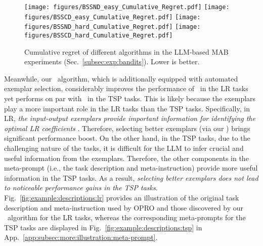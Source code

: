 \begin{figure}[h]
\vspace{3mm}
\centering
\texttt{[image: figures/BSSND\_easy\_Cumulative\_Regret.pdf]}
\texttt{[image: figures/BSSCD\_easy\_Cumulative\_Regret.pdf]}
\texttt{[image: figures/BSSND\_hard\_Cumulative\_Regret.pdf]}
\texttt{[image: figures/BSSCD\_hard\_Cumulative\_Regret.pdf]}
\vspace{-2mm}
\caption{
Cumulative regret of different algorithms in the LLM-based MAB experiments (Sec.~\ref{subsec:exp:bandits}). Lower is better.
}
\label{fig:cumulative_regret_BSSND_BSSCD}
\vspace{-3mm}
\end{figure}

Meanwhile, our \alges~algorithm, which is additionally equipped with automated exemplar selection, considerably improves the performance of \alg~in the LR tasks yet performs on par with \alg~in the TSP tasks.
This is likely because the exemplars play a more important role in the LR tasks than the TSP tasks. 
Specifically, in LR, \emph{the input-output exemplars provide important information for identifying the optimal LR coefficients} \cite{wu2024prompt}. Therefore, selecting better exemplars (via our \alges) brings significant performance boost. 
On the other hand, in the TSP tasks, due to the challenging nature of the tasks, it is difficult for the LLM to infer crucial and useful information from the exemplars. 
Therefore, the other components in the meta-prompt (i.e., the task description and meta-instruction) provide more useful information 
in the TSP tasks.
As a result, \emph{selecting better exemplars does not lead to noticeable performance gains in the TSP tasks}.
Fig.~\ref{fig:example:descriptions:lr} provides an illustration of the original task description and meta-instruction used by OPRO and those discovered by our \alg~algorithm for the LR tasks, whereas the corresponding meta-prompts for the TSP tasks are displayed in Fig.~\ref{fig:example:descriptions:tsp} in App.~\ref{app:subsec:more:illustration:meta-prompt}.



